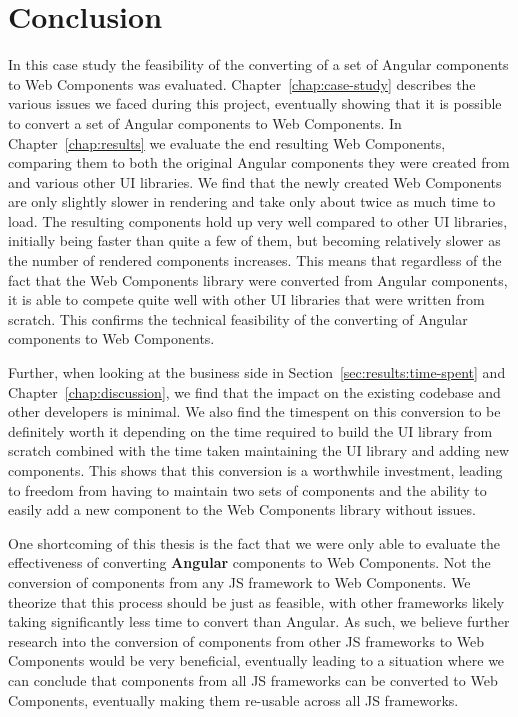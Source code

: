 \chapter{Conclusion}\label{chap:conclusion}

In this case study the feasibility of the converting of a set of Angular components to Web Components was evaluated. Chapter~\ref{chap:case-study} describes the various issues we faced during this project, eventually showing that it is possible to convert a set of Angular components to Web Components. In Chapter~\ref{chap:results} we evaluate the end resulting Web Components, comparing them to both the original Angular components they were created from and various other UI libraries. We find that the newly created Web Components are only slightly slower in rendering and take only about twice as much time to load. The resulting components hold up very well compared to other UI libraries, initially being faster than quite a few of them, but becoming relatively slower as the number of rendered components increases. This means that regardless of the fact that the Web Components library were converted from Angular components, it is able to compete quite well with other UI libraries that were written from scratch. This confirms the technical feasibility of the converting of Angular components to Web Components.

Further, when looking at the business side in Section~\ref{sec:results:time-spent} and Chapter~\ref{chap:discussion}, we find that the impact on the existing codebase and other developers is minimal. We also find the timespent on this conversion to be definitely worth it depending on the time required to build the UI library from scratch combined with the time taken maintaining the UI library and adding new components. This shows that this conversion is a worthwhile investment, leading to freedom from having to maintain two sets of components and the ability to easily add a new component to the Web Components library without issues.

One shortcoming of this thesis is the fact that we were only able to evaluate the effectiveness of converting \textbf{Angular} components to Web Components. Not the conversion of components from any JS framework to Web Components. We theorize that this process should be just as feasible, with other frameworks likely taking significantly less time to convert than Angular. As such, we believe further research into the conversion of components from other JS frameworks to Web Components would be very beneficial, eventually leading to a situation where we can conclude that components from all JS frameworks can be converted to Web Components, eventually making them re-usable across all JS frameworks.